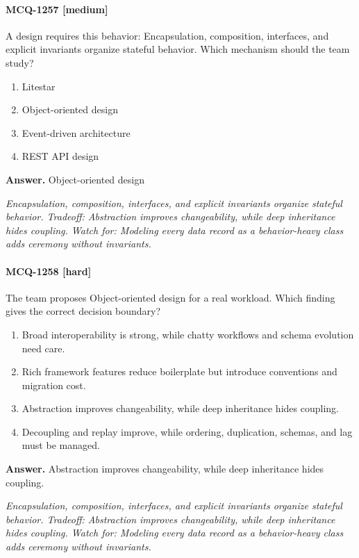 \paragraph{MCQ-1257 [medium]} A design requires this behavior: Encapsulation, composition, interfaces, and explicit invariants organize stateful behavior. Which mechanism should the team study?
\begin{enumerate}[label=\Alph*.]
\item Litestar
\item Object-oriented design
\item Event-driven architecture
\item REST API design
\end{enumerate}
\noindent\textbf{Answer.} Object-oriented design
\par\textit{Encapsulation, composition, interfaces, and explicit invariants organize stateful behavior. Tradeoff: Abstraction improves changeability, while deep inheritance hides coupling. Watch for: Modeling every data record as a behavior-heavy class adds ceremony without invariants.}
\paragraph{MCQ-1258 [hard]} The team proposes Object-oriented design for a real workload. Which finding gives the correct decision boundary?
\begin{enumerate}[label=\Alph*.]
\item Broad interoperability is strong, while chatty workflows and schema evolution need care.
\item Rich framework features reduce boilerplate but introduce conventions and migration cost.
\item Abstraction improves changeability, while deep inheritance hides coupling.
\item Decoupling and replay improve, while ordering, duplication, schemas, and lag must be managed.
\end{enumerate}
\noindent\textbf{Answer.} Abstraction improves changeability, while deep inheritance hides coupling.
\par\textit{Encapsulation, composition, interfaces, and explicit invariants organize stateful behavior. Tradeoff: Abstraction improves changeability, while deep inheritance hides coupling. Watch for: Modeling every data record as a behavior-heavy class adds ceremony without invariants.}
